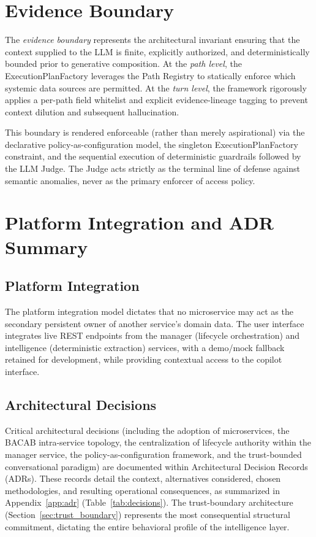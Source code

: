 \section{Evidence Boundary}\label{sec:pipeline_vertical_slicing}
The \textit{evidence boundary} represents the architectural invariant ensuring that the context supplied to the LLM is finite, explicitly authorized, and deterministically bounded prior to generative composition. At the \textit{path level}, the ExecutionPlanFactory leverages the Path Registry to statically enforce which systemic data sources are permitted. At the \textit{turn level}, the framework rigorously applies a per-path field whitelist and explicit evidence-lineage tagging to prevent context dilution and subsequent hallucination.

This boundary is rendered enforceable (rather than merely aspirational) via the declarative policy-as-configuration model, the singleton ExecutionPlanFactory constraint, and the sequential execution of deterministic guardrails followed by the LLM Judge. The Judge acts strictly as the terminal line of defense against semantic anomalies, never as the primary enforcer of access policy.

\section{Platform Integration and ADR Summary}\label{sec:integration}
\subsection{Platform Integration}
The platform integration model dictates that no microservice may act as the secondary persistent owner of another service's domain data. The user interface integrates live REST endpoints from the manager (lifecycle orchestration) and intelligence (deterministic extraction) services, with a demo/mock fallback retained for development, while providing contextual access to the copilot interface.

\subsection{Architectural Decisions}
Critical architectural decisions (including the adoption of microservices, the BACAB intra-service topology, the centralization of lifecycle authority within the manager service, the policy-as-configuration framework, and the trust-bounded conversational paradigm) are documented within Architectural Decision Records (ADRs). These records detail the context, alternatives considered, chosen methodologies, and resulting operational consequences, as summarized in Appendix~\ref{app:adr} (Table~\ref{tab:decisions}). The trust-boundary architecture (Section~\ref{sec:trust_boundary}) represents the most consequential structural commitment, dictating the entire behavioral profile of the intelligence layer.

